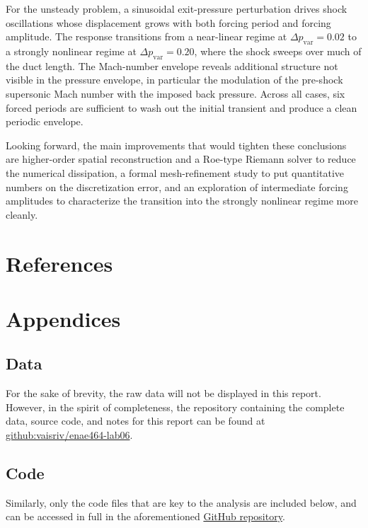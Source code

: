 For the unsteady problem, a sinusoidal exit-pressure perturbation drives shock oscillations whose displacement grows with both forcing period and forcing amplitude. The response transitions from a near-linear regime at \(\Delta p_\text{var} = 0.02\) to a strongly nonlinear regime at \(\Delta p_\text{var} = 0.20\), where the shock sweeps over much of the duct length. The Mach-number envelope reveals additional structure not visible in the pressure envelope, in particular the modulation of the pre-shock supersonic Mach number with the imposed back pressure. Across all cases, six forced periods are sufficient to wash out the initial transient and produce a clean periodic envelope.

Looking forward, the main improvements that would tighten these conclusions are higher-order spatial reconstruction and a Roe-type Riemann solver to reduce the numerical dissipation, a formal mesh-refinement study to put quantitative numbers on the discretization error, and an exploration of intermediate forcing amplitudes to characterize the transition into the strongly nonlinear regime more cleanly.

\section{References} \label{sec:references}

\printbibliography[heading=none]

\section{Appendices} \label{sec:appendices}

\subsection{Data} \label{sec:appendices/data}

For the sake of brevity, the raw data will not be displayed in this report. However, in the spirit of completeness, the repository containing the complete data, source code, and notes for this report can be found at \href{https://www.github.com/vaisriv/enae464-lab06}{github:vaisriv/enae464-lab06}.

\subsection{Code} \label{sec:appendices/code}

Similarly, only the code files that are key to the analysis are included below, and can be accessed in full in the aforementioned \href{https://www.github.com/vaisriv/enae464-lab05}{GitHub repository}.


